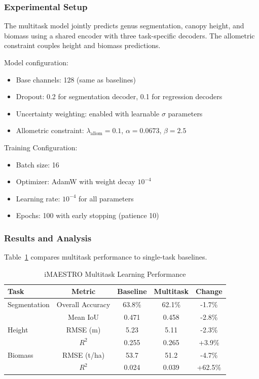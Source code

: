 \subsubsection{Experimental Setup}

The multitask model jointly predicts genus segmentation, canopy height, and biomass using a shared encoder with three task-specific decoders. The allometric constraint couples height and biomass predictions.

Model configuration:

\begin{itemize}
    \item Base channels: 128 (same as baselines)
    \item Dropout: 0.2 for segmentation decoder, 0.1 for regression decoders
    \item Uncertainty weighting: enabled with learnable $\sigma$ parameters
    \item Allometric constraint: $\lambda_{\text{allom}} = 0.1$, $\alpha = 0.0673$, $\beta = 2.5$        
\end{itemize}

Training Configuration:

\begin{itemize}
    \item Batch size: 16
    \item Optimizer: AdamW with weight decay $10^{-4}$
    \item Learning rate: $10^{-4}$ for all parameters
    \item Epochs: 100 with early stopping (patience 10)
\end{itemize}

\subsubsection{Results and Analysis}

Table~\ref{tab:imaestro_mtl} compares multitask performance to single-task baselines.

\begin{table}[htbp]
\centering
\caption{iMAESTRO Multitask Learning Performance}
\label{tab:imaestro_mtl}
\begin{tabular}{lcccc}
\hline
\textbf{Task} & \textbf{Metric} & \textbf{Baseline} & \textbf{Multitask} & \textbf{Change} \\
\hline
Segmentation & Overall Accuracy & 63.8\% & 62.1\% & -1.7\% \\
             & Mean IoU & 0.471 & 0.458 & -2.8\% \\
Height       & RMSE (m) & 5.23 & 5.11 & -2.3\% \\
             & $R^2$ & 0.255 & 0.265 & +3.9\% \\
Biomass      & RMSE (t/ha) & 53.7 & 51.2 & -4.7\% \\
             & $R^2$ & 0.024 & 0.039 & +62.5\% \\
\hline
\end{tabular}
\end{table}

